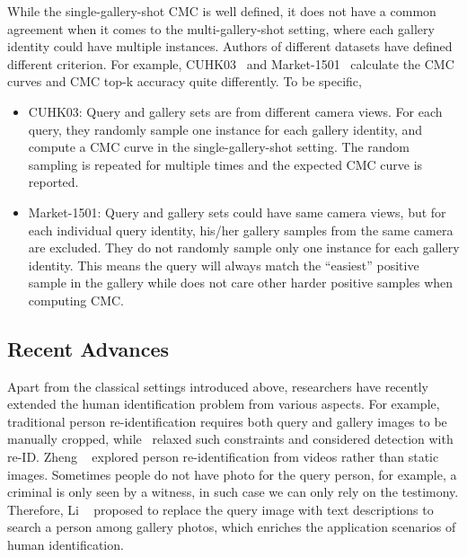 While the single-gallery-shot CMC is well defined, it does not have a common agreement when it comes to the multi-gallery-shot setting, where each gallery identity could have multiple instances. Authors of different datasets have defined different criterion. For example, CUHK03~\cite{li2014deepreid} and Market-1501~\cite{zheng2015scalable} calculate the CMC curves and CMC top-k accuracy quite differently. To be specific,

\begin{itemize}
  \item CUHK03: Query and gallery sets are from different camera views. For each query, they randomly sample one instance for each gallery identity, and compute a CMC curve in the single-gallery-shot setting. The random sampling is repeated for multiple times and the expected CMC curve is reported.
  \item Market-1501: Query and gallery sets could have same camera views, but for each individual query identity, his/her gallery samples from the same camera are excluded. They do not randomly sample only one instance for each gallery identity. This means the query will always match the ``easiest'' positive sample in the gallery while does not care other harder positive samples when computing CMC.
\end{itemize}

\subsection{Recent Advances} %
\label{sub:human-id-recent-adv}
Apart from the classical settings introduced above, researchers have recently extended the human identification problem from various aspects. For example, traditional person re-identification requires both query and gallery images to be manually cropped, while~\cite{xu2014person,xiaoli2017joint,zheng2017person} relaxed such constraints and considered detection with re-ID. Zheng \etal~\cite{zheng2016mars} explored person re-identification from videos rather than static images. Sometimes people do not have photo for the query person, for example, a criminal is only seen by a witness, in such case we can only rely on the testimony. Therefore, Li \etal~\cite{li2017person} proposed to replace the query image with text descriptions to search a person among gallery photos, which enriches the application scenarios of human identification.

